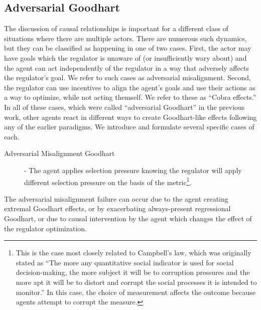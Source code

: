 \documentclass[10pt]{article}
\begin{document}
\subsection{Adversarial Goodhart}

The discussion of causal relationships is important for a different class of situations where there are multiple actors. There are numerous such dynamics, but they can be classified as happening in one of two cases. First, the actor may have goals which the regulator is unaware of (or insufficiently wary about) and the agent can act independently of the regulator in a way that adversely affects the regulator's goal. We refer to such cases as adversarial misalignment. Second, the regulator can use incentives to align the agent's goals and use their actions as a way to optimize, while not acting themself. We refer to these as ``Cobra effects.'' In all of these cases, which were called ``adversarial Goodhart'' in the previous work, other agents react in different ways to create Goodhart-like effects following any of the earlier paradigms. We introduce and formulate several specific cases of each.

\begin{description}
\item[Adversarial Misalignment Goodhart] - The agent applies selection pressure knowing the regulator will apply different selection pressure on the basis of the metric\footnote{This is the case most closely related to Campbell's law\cite{campbell}, which was originally stated as  ``The more any quantitative social indicator is used for social decision-making, the more subject it will be to corruption pressures and the more apt it will be to distort and corrupt the social processes it is intended to monitor.'' In this case, the choice of measurement affects the outcome because agents attempt to corrupt the measure.}.\end{description} The adversarial misalignment failure can occur due to the agent creating extremal Goodhart effects, or by exacerbating always-present regressional Goodhart, or due to causal intervention by the agent which changes the effect of the regulator optimization.
\end{document}
